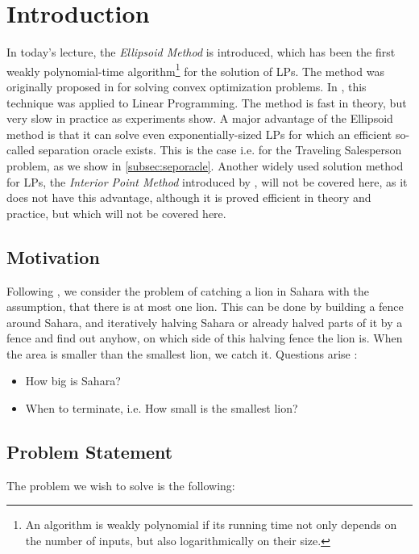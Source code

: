 \documentclass[10pt]{article}
\begin{document}


\section{Introduction}
In today's lecture, the \emph{Ellipsoid Method} is introduced, which has been the first weakly polynomial-time algorithm\footnote{An algorithm is weakly polynomial if its running time not only depends on the number of inputs, but also logarithmically on their size.} for the solution of LPs. The method was originally proposed in \cite{shor77} for solving convex optimization problems. In \cite{khachiyan79}, this technique was applied to Linear Programming. The method is fast in theory, but very slow in practice as experiments show. A major advantage of the Ellipsoid method is that it can solve even exponentially-sized LPs for which an efficient so-called separation oracle exists. This is the case i.e. for the Traveling Salesperson problem, as we show in \autoref{subsec:seporacle}. Another widely used solution method for LPs, the \emph{Interior Point Method} introduced by \cite{karmarkar89}, will not be covered here, as it does not have this advantage, although it is proved efficient in theory and practice, but which will not be covered here. 

\subsection{Motivation}
Following \cite{lovaszschrijver}, we consider the problem of catching a lion in Sahara with the assumption, that there is at most one lion. This can be done by building a fence around Sahara, and iteratively halving Sahara or already halved parts of it by a fence and find out anyhow, on which side of this halving fence the lion is. When the area is smaller than the smallest lion, we catch it. Questions arise :
\begin{itemize}
\item How big is Sahara?
\item When to terminate, i.e. How small is the smallest lion?
\end{itemize}

\subsection{Problem Statement}
The problem we wish to solve is the following:
\end{document}

